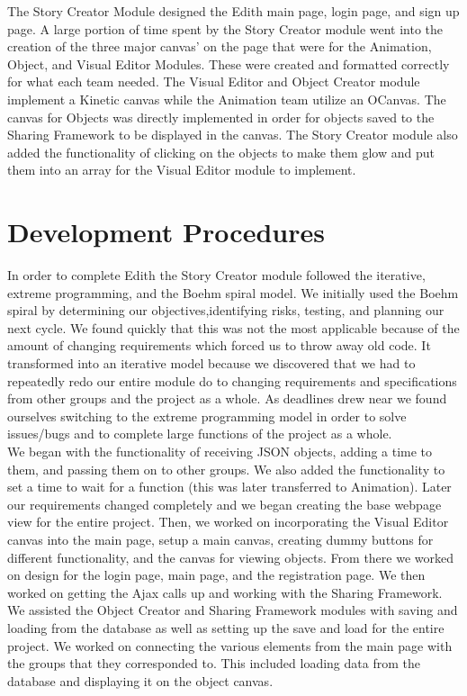 \documentclass[12pt]{article}
\begin{document}
The Story Creator Module designed the Edith main page, login page, and sign up page.  A large portion of time spent by the Story Creator module went into the creation of the three major canvas' on the page that were for the Animation, Object, and Visual Editor Modules.  These were created and formatted correctly for what each team needed.  The Visual Editor and Object Creator module implement a Kinetic canvas while the Animation team utilize an OCanvas.  The canvas for Objects was directly implemented in order for objects saved to the Sharing Framework to be displayed in the canvas.  The Story Creator module also added the functionality of clicking on the objects to make them glow and put them into an array for the Visual Editor module to implement.   


\section{Development Procedures}
In order to complete Edith the Story Creator module followed the iterative, extreme programming, and the Boehm spiral model.  We initially used the Boehm spiral by determining our objectives,identifying risks, testing, and planning our next cycle.  We found quickly that this was not the most applicable because of the amount of changing requirements which forced us to throw away old code.  It transformed into an iterative model because we discovered that we had to repeatedly redo our entire module do to changing requirements and specifications from other groups and the project as a whole.  As deadlines drew near we found ourselves switching to the extreme programming model in order to solve issues/bugs and to complete large functions of the project as a whole.  \\

We began with the functionality of receiving JSON objects, adding a time to them, and passing them on to other groups.  We also added the functionality to set a time to wait for a function (this was later transferred to Animation).  Later our requirements changed completely and we began creating the base webpage view for the entire project.  Then, we worked on incorporating the Visual Editor canvas into the main page, setup a main canvas, creating dummy buttons for different functionality, and the canvas for viewing objects.  From there we worked on design for the login page, main page, and the registration page.  We then worked on getting the Ajax calls up and working with the Sharing Framework.  We assisted the Object Creator and Sharing Framework modules with saving and loading from the database as well as setting up the save and load for the entire project.  We worked on connecting the various elements from the main page with the groups that they corresponded to.  This included loading data from the database and displaying it on the object canvas.  \\
\end{document}
